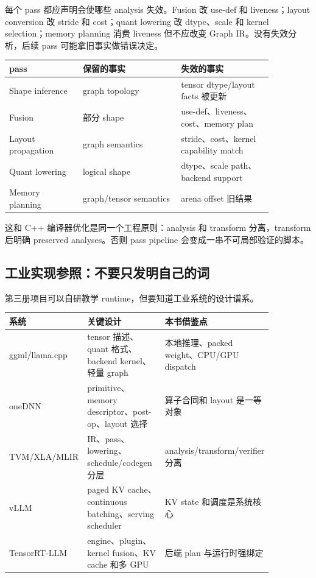 每个 pass 都应声明会使哪些 analysis 失效。Fusion 改 use-def 和 liveness；layout conversion 改 stride 和 cost；quant lowering 改 dtype、scale 和 kernel selection；memory planning 消费 liveness 但不应改变 Graph IR。没有失效分析，后续 pass 可能拿旧事实做错误决定。

\begin{center}
\begin{tabular}{p{0.24\linewidth}p{0.32\linewidth}p{0.30\linewidth}}
\toprule
pass & 保留的事实 & 失效的事实 \\
\midrule
Shape inference & graph topology & tensor dtype/layout facts 被更新 \\
Fusion & 部分 shape & use-def、liveness、cost、memory plan \\
Layout propagation & graph semantics & stride、cost、kernel capability match \\
Quant lowering & logical shape & dtype、scale path、backend support \\
Memory planning & graph/tensor semantics & arena offset 旧结果 \\
\bottomrule
\end{tabular}
\end{center}

这和 C++ 编译器优化是同一个工程原则：analysis 和 transform 分离，transform 后明确 preserved analyses。否则 pass pipeline 会变成一串不可局部验证的脚本。

\subsection{工业实现参照：不要只发明自己的词}

第三册项目可以自研教学 runtime，但要知道工业系统的设计谱系。

\begin{center}
\begin{tabular}{p{0.20\linewidth}p{0.36\linewidth}p{0.30\linewidth}}
\toprule
系统 & 关键设计 & 本书借鉴点 \\
\midrule
ggml/llama.cpp & tensor 描述、quant 格式、backend kernel、轻量 graph & 本地推理、packed weight、CPU/GPU dispatch \\
oneDNN & primitive、memory descriptor、post-op、layout 选择 & 算子合同和 layout 是一等对象 \\
TVM/XLA/MLIR & IR、pass、lowering、schedule/codegen 分层 & analysis/transform/verifier 分离 \\
vLLM & paged KV cache、continuous batching、serving scheduler & KV state 和调度是系统核心 \\
TensorRT-LLM & engine、plugin、kernel fusion、KV cache 和多 GPU & 后端 plan 与运行时强绑定 \\
\bottomrule
\end{tabular}
\end{center}

